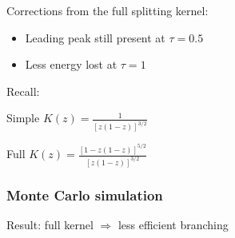 \documentclass[pstricks,mathserif]{beamer}
\begin{document}
\begin{frame}
Corrections from the full splitting kernel:
\begin{itemize}
\item Leading peak still present at $\tau=0.5$
\item Less energy lost at $\tau=1$
\end{itemize}


Recall:

Simple $K(z)=\frac{1}{[z(1-z)]^{3/2}}$


Full $K(z)=\frac{[1-z(1-z)]^{5/2}}{[z(1-z)]^{3/2}}$


\endminipage\hfill


\end{frame}


\begin{frame}
\frametitle{Monte Carlo simulation}

Result: full kernel $\Rightarrow$ less efficient branching\\
~\\




\end{frame}
\end{document}
